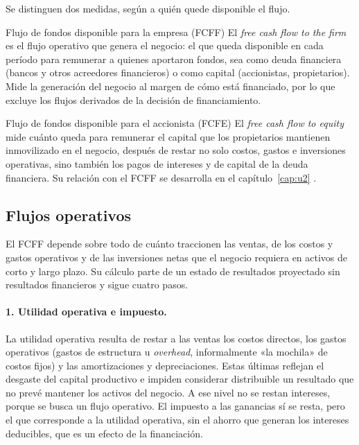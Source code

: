 Se distinguen dos medidas, según a quién quede disponible el flujo.

\begin{definicion}{Flujo de fondos disponible para la empresa (FCFF)}
El \emph{free cash flow to the firm} es el flujo operativo que genera el negocio: el que queda disponible en cada período para remunerar a quienes aportaron fondos, sea como deuda financiera (bancos y otros acreedores financieros) o como capital (accionistas, propietarios). Mide la generación del negocio al margen de cómo está financiado, por lo que excluye los flujos derivados de la decisión de financiamiento.
\end{definicion}

\begin{definicion}{Flujo de fondos disponible para el accionista (FCFE)}
El \emph{free cash flow to equity} mide cuánto queda para remunerar el capital que los propietarios mantienen inmovilizado en el negocio, después de restar no solo costos, gastos e inversiones operativas, sino también los pagos de intereses y de capital de la deuda financiera. Su relación con el FCFF se desarrolla en el capítulo~\ref{cap:u2} .
\end{definicion}

\subsection{Flujos operativos}

El FCFF depende sobre todo de cuánto traccionen las ventas, de los costos y gastos operativos y de las inversiones netas que el negocio requiera en activos de corto y largo plazo. Su cálculo parte de un estado de resultados proyectado sin resultados financieros y sigue cuatro pasos.

\paragraph{1. Utilidad operativa e impuesto.} La utilidad operativa resulta de restar a las ventas los costos directos, los gastos operativos (gastos de estructura u \emph{overhead}, informalmente «la mochila» de costos fijos) y las amortizaciones y depreciaciones. Estas últimas reflejan el desgaste del capital productivo e impiden considerar distribuible un resultado que no prevé mantener los activos del negocio. A ese nivel no se restan intereses, porque se busca un flujo operativo. El impuesto a las ganancias sí se resta, pero el que corresponde a la utilidad operativa, sin el ahorro que generan los intereses deducibles, que es un efecto de la financiación.

